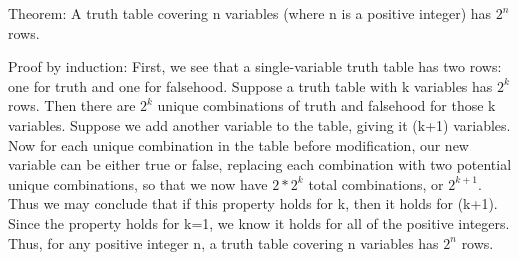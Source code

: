 \documentclass{article}
\begin{document}
Theorem: A truth table covering n variables (where n is a positive integer) has
$2^n$ rows.

Proof by induction: First, we see that a single-variable truth table has two
rows: one for truth and one for falsehood. Suppose a truth table with k
variables has $2^k$ rows. Then there are $2^k$ unique combinations of truth and
falsehood for those k variables. Suppose we add another variable to the table,
giving it (k+1) variables. Now for each unique combination in the table before
modification, our new variable can be either true or false, replacing each
combination with two potential unique combinations, so that we now have $2*2^k$
total combinations, or $2^{k+1}$. Thus we may conclude that if this property
holds for k, then it holds for (k+1). Since the property holds for k=1, we know
it holds for all of the positive integers. Thus, for any positive integer n, a
truth table covering n variables has $2^n$ rows.
\end{document}
